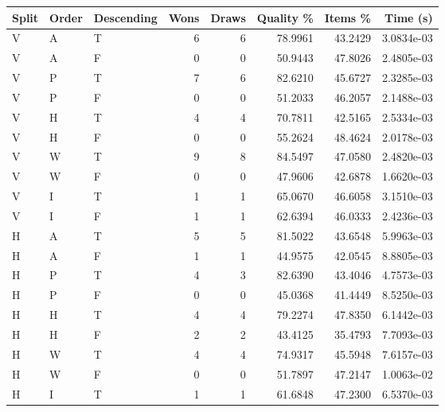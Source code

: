 \begin{tabular}{lllrrrrr}
    \hline
    Split & Order & Descending & Wons & Draws & Quality \% & Items \% & Time (s)   \\
    \hline
    V     & A     & T          & 6    & 6     & 78.9961    & 43.2429  & 3.0834e-03 \\
    V     & A     & F          & 0    & 0     & 50.9443    & 47.8026  & 2.4805e-03 \\
    V     & P     & T          & 7    & 6     & 82.6210    & 45.6727  & 2.3285e-03 \\
    V     & P     & F          & 0    & 0     & 51.2033    & 46.2057  & 2.1488e-03 \\
    V     & H     & T          & 4    & 4     & 70.7811    & 42.5165  & 2.5334e-03 \\
    V     & H     & F          & 0    & 0     & 55.2624    & 48.4624  & 2.0178e-03 \\
    V     & W     & T          & 9    & 8     & 84.5497    & 47.0580  & 2.4820e-03 \\
    V     & W     & F          & 0    & 0     & 47.9606    & 42.6878  & 1.6620e-03 \\
    V     & I     & T          & 1    & 1     & 65.0670    & 46.6058  & 3.1510e-03 \\
    V     & I     & F          & 1    & 1     & 62.6394    & 46.0333  & 2.4236e-03 \\
    H     & A     & T          & 5    & 5     & 81.5022    & 43.6548  & 5.9963e-03 \\
    H     & A     & F          & 1    & 1     & 44.9575    & 42.0545  & 8.8805e-03 \\
    H     & P     & T          & 4    & 3     & 82.6390    & 43.4046  & 4.7573e-03 \\
    H     & P     & F          & 0    & 0     & 45.0368    & 41.4449  & 8.5250e-03 \\
    H     & H     & T          & 4    & 4     & 79.2274    & 47.8350  & 6.1442e-03 \\
    H     & H     & F          & 2    & 2     & 43.4125    & 35.4793  & 7.7093e-03 \\
    H     & W     & T          & 4    & 4     & 74.9317    & 45.5948  & 7.6157e-03 \\
    H     & W     & F          & 0    & 0     & 51.7897    & 47.2147  & 1.0063e-02 \\
    H     & I     & T          & 1    & 1     & 61.6848    & 47.2300  & 6.5370e-03 \\

\end{tabular}
